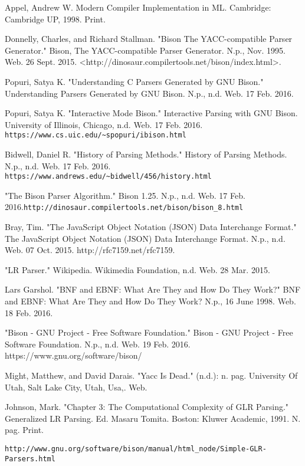 \documentclass {report}
\begin{document}
\begin{thebibliography}{}
 Appel, Andrew W. Modern Compiler Implementation in ML. Cambridge: Cambridge UP, 1998. Print.

 Donnelly, Charles, and Richard Stallman. "Bison The YACC-compatible Parser Generator." Bison, The YACC-compatible Parser Generator. N.p., Nov. 1995. Web. 26 Sept. 2015. <http://dinosaur.compilertools.net/bison/index.html>.

 Popuri, Satya K. "Understanding C Parsers Generated by GNU Bison." Understanding Parsers Generated by GNU Bison. N.p., n.d. Web. 17 Feb. 2016.

 Popuri, Satya K. "Interactive Mode Bison." Interactive Parsing with GNU Bison. University of Illinois, Chicago, n.d. Web. 17 Feb. 2016. \verb|https://www.cs.uic.edu/~spopuri/ibison.html|

 Bidwell, Daniel R. "History of Parsing Methods." History of Parsing Methods. N.p., n.d. Web. 17 Feb. 2016. \verb|https://www.andrews.edu/~bidwell/456/history.html|

 "The Bison Parser Algorithm." Bison 1.25. N.p., n.d. Web. 17 Feb. 2016.\verb|http://dinosaur.compilertools.net/bison/bison_8.html|

 Bray, Tim. "The JavaScript Object Notation (JSON) Data Interchange Format." The JavaScript Object Notation (JSON) Data Interchange Format. N.p., n.d. Web. 07 Oct. 2015. http://rfc7159.net/rfc7159.

 "LR Parser." Wikipedia. Wikimedia Foundation, n.d. Web. 28 Mar. 2015.

 Lars Garshol. "BNF and EBNF: What Are They and How Do They Work?" BNF and EBNF: What Are They and How Do They Work? N.p., 16 June 1998. Web. 18 Feb. 2016.

 "Bison - GNU Project - Free Software Foundation." Bison - GNU Project - Free Software Foundation. N.p., n.d. Web. 19 Feb. 2016. https://www.gnu.org/software/bison/

 Might, Matthew, and David Darais. "Yacc Is Dead." (n.d.): n. pag. University Of Utah, Salt Lake City, Utah, Usa,. Web.

 Johnson, Mark. "Chapter 3: The Computational Complexity of GLR Parsing." Generalized LR Parsing. Ed. Masaru Tomita. Boston: Kluwer Academic, 1991. N. pag. Print. 

 \verb|http://www.gnu.org/software/bison/manual/html_node/Simple-GLR-Parsers.html|

\end{thebibliography}
\end{document}
